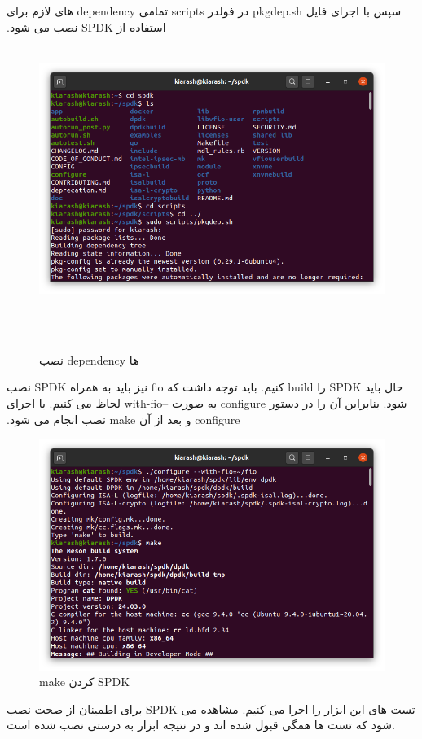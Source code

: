 ‫سپس با اجرای فایل pkgdep.sh در فولدر scripts تمامی dependency های لازم برای استفاده از SPDK نصب می شود.
‫
‫
‫\begin{figure}[H]
‫    \centering
‫    \includegraphics[width=\textwidth]{figs/pkgdep.png}
‫    \caption{نصب dependency ها}
‫\end{figure}
‫
‫حال باید SPDK را build کنیم. باید توجه داشت که fio نیز باید به همراه SPDK نصب شود. بنابراین آن را در دستور configure به صورت  --with-fio لحاظ می کنیم. با اجرای configure و بعد از آن make نصب انجام می شود.
‫
‫
\begin{figure}[H]
    \centering
    \includegraphics[width=\textwidth]{figs/configure.png}
    \caption{make کردن SPDK}
\end{figure}

برای اطمینان از صحت نصب SPDK تست های این ابزار را اجرا می کنیم. مشاهده می شود که تست ها همگی قبول شده اند و در نتیجه ابزار به درستی نصب شده است.

